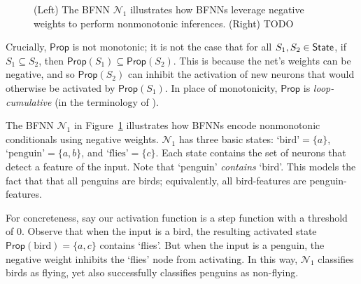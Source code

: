 \documentclass[letterpaper]{article}
\theoremstyle{definition}
\newcommand{\State}{\mbox{\sf State}}
\newcommand{\Prop}{\textsf{Prop}}
\newcommand{\Net}{\mathcal{N}}
\begin{document}
\begin{figure}
{
}
\caption{(Left) The BFNN $\Net_1$ illustrates how BFNNs leverage negative weights to perform nonmonotonic inferences.
(Right) TODO }
\label{fig:monotonicity-counterexamples}
\end{figure}

Crucially, $\Prop$ is not monotonic; it is not the case that for all $S_1, S_2 \in \State$, if $S_1 \subseteq S_2$, then $\Prop(S_1) \subseteq \Prop(S_2)$.  This is because the net's weights can be negative, and so $\Prop(S_2)$ can inhibit the activation of new neurons that would otherwise be activated by $\Prop(S_1)$.  In place of monotonicity, $\Prop$ is \emph{loop-cumulative} (in the terminology of \citep{kraus1990nonmonotonic}).

The BFNN $\Net_1$ in Figure~\ref{fig:monotonicity-counterexamples} illustrates how BFNNs encode nonmonotonic conditionals using negative weights.  $\Net_1$ has three basic states: $\text{`bird'} = \{a\}$, $\text{`penguin'} = \{a, b\}$, and $\text{`flies'} = \{c\}$. Each state contains the set of neurons that detect a feature of the input.  Note that `penguin' \emph{contains} `bird'.  This models the fact that that all penguins are birds; equivalently, all bird-features are penguin-features.

For concreteness, say our activation function is a step function with a threshold of $0$.  Observe that when the input is a bird, the resulting activated state $\Prop(\text{bird}) = \{a, c\}$ contains `flies'.  But when the input is a penguin, the negative weight inhibits the `flies' node from activating.  In this way, $\Net_1$ classifies birds as flying, yet also successfully classifies penguins as non-flying.
\end{document}
